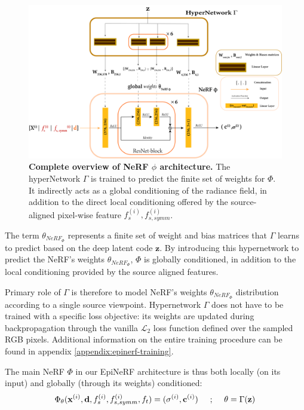 \begin{figure}[htp!]
  \begin{center}
\includegraphics[width=\linewidth]{images/epinerf/supp_hyper_nerf.png}
\caption{\textbf{Complete overview of NeRF $\phi$ architecture.} The hyperNetwork $\Gamma$ is trained to predict the finite set of weights for $\Phi$. It indirectly acts as a global conditioning of the radiance field, in addition to the direct local conditioning offered by the source-aligned pixel-wise feature $f_{s}^{(i)},f_{s,symm}^{(i)}$.}
\label{fig:supp_hyper_nerf}
\end{center}
\end{figure} 

The term $\theta_{NeRF_{\Phi}}$ represents a finite set of weight and bias matrices that $\Gamma$ learns to predict based on the deep latent code $\mathbf{z}$. By introducing this hypernetwork to predict the \ac{NeRF}'s weights $\theta_{NeRF_{\Phi}}$, $\Phi$ is globally conditioned, in addition to the local conditioning provided by the source aligned features.  \newline

Primary role of $\Gamma$ is therefore to model NeRF's weights $\theta_{NeRF_{\Phi}}$ distribution according to a single source viewpoint. Hypernetwork $\Gamma$ does not have to be trained with a specific loss objective: its weights are updated during  backpropagation through the vanilla $\mathcal{L}_{2}$ loss function defined over the sampled RGB pixels. Additional information on the entire training procedure can be found in appendix \ref{appendix:epinerf-training}. 

The main NeRF $\Phi$ in our EpiNeRF architecture is thus both locally (on its input) and  globally (through its weights) conditioned: 
\begin{equation}
     \Phi_{\theta}(\mathbf{x}^{(i)},\mathbf{d},f_{s}^{(i)},f_{s,symm}^{(i)},f_{t}) = (\sigma^{(i)},\mathbf{c}^{(i)}) \hspace{.5cm}\text{;}\hspace{.5cm}  \theta = \Gamma(\mathbf{z})
\end{equation}

